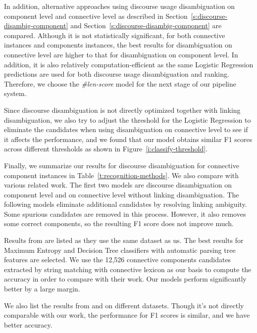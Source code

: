 In addition, alternative approaches using discourse usage
disambiguation on component level and connective
level as described in Section~\ref{s:discourse-disambig-component} and
Section~\ref{s:discourse-disambig-component} are compared.
Although it is not statistically significant, for both connective
instances and components instances, the best results for disambiguation on connective
level are higher to that for disambiguation on component level.
In addition, it is also relatively computation-efficient as the same Logistic
Regression predictions are used for both discourse usage disambiguation and ranking.
Therefore, we choose the \textit{\#len-score} model for the next stage of our
pipeline system.



Since discourse disambiguation is not directly optimized together with linking
disambiguation, we also try to adjust the threshold for the Logistic Regression
to eliminate the candidates when using disambiguation on connective level to see if
it affects the performance, and we found that our model
obtains similar F1 scores across different thresholds as
shown in Figure~\ref{i:classify-threshold}.



Finally, we summarize our results for discourse disambiguation for
connective component instances in Table~\ref{t:recognition-methods}. We also
compare with various related work. The first two models are discourse disambiguation
on component level and on connective level without linking disambiguation. The following
models eliminate additional candidates by resolving linking ambiguity.
Some spurious candidates are removed in this process. However, it also removes some
correct components, so the resulting F1 score does not improve much.



Results from \cite{li2015automatic} are listed as they use the
same dataset as us. The best results for Maximum Entropy and Decision Tree classifiers with
automatic parsing tree features are selected. We use the 12,526 connective components candidates
extracted by string matching with connective lexicon as our basis to compute the accuracy in order
to compare with their work. Our models perform significantly better by a large margin.

We also list the results from \cite{zhou2012cross} and \cite{li2014cross} on different
datasets. Though it's not directly comparable with our work, the performance for F1 scores is similar,
and we have better accuracy.


